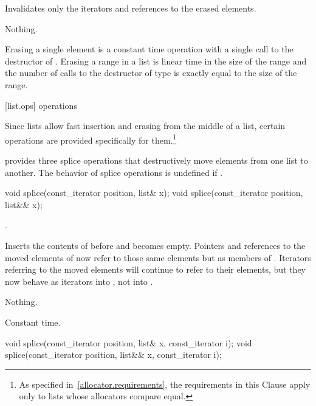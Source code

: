 \begin{itemdescr}
\pnum
\effects
Invalidates only the iterators and references to the erased elements.

\pnum
\throws Nothing.

\pnum
\complexity
Erasing a single element is a constant time operation with a single call to the destructor of
.
Erasing a range in a list is linear time in the
size of the range and the number of calls to the destructor of type
is exactly equal to the size of the range.
\end{itemdescr}

[list.ops]{ operations}

\pnum
Since lists allow fast insertion and erasing from the middle of a list, certain
operations are provided specifically for them.\footnote{As specified
in~\ref{allocator.requirements}, the requirements in this Clause apply only to
lists whose allocators compare equal.}

\pnum
{} provides three splice operations that destructively move elements from one list to
another. The behavior of splice operations is undefined if .

%
\begin{itemdecl}
void splice(const_iterator position, list& x);
void splice(const_iterator position, list&& x);
\end{itemdecl}

\begin{itemdescr}
\pnum
\requires
{}.

\pnum
\effects
Inserts the contents of
before
and
becomes empty.
Pointers and references to the moved elements of
now refer to those same elements but as members of
.
Iterators referring to the moved elements will continue to refer to their
elements, but they now behave as iterators into
,
not into
.

\pnum
\throws Nothing.

\pnum
\complexity
Constant time.
\end{itemdescr}

%
\begin{itemdecl}
void splice(const_iterator position, list& x, const_iterator i);
void splice(const_iterator position, list&& x, const_iterator i);
\end{itemdecl}

